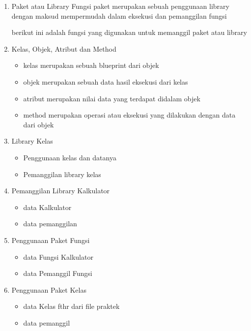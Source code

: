 \begin{enumerate}
\item Paket atau Library Fungsi
	\subitem paket merupakan sebuah penggunaan library dengan maksud mempermudah dalam eksekusi dan pemanggilan fungsi
		
	berikut ini adalah fungsi yang digunakan untuk memanggil paket atau library
		
\item Kelas, Objek, Atribut dan Method
	\begin{itemize}
	\item kelas merupakan sebuah blueprint dari objek
	\item objek merupakan sebuah data hasil eksekusi dari kelas
	\item atribut merupakan nilai data yang terdapat didalam objek
	\item method merupakan operasi atau eksekusi yang dilakukan dengan data dari objek
		
	\end{itemize}
\item Library Kelas
	\begin{itemize}
	\item Penggunaan kelas dan datanya
		
	\item Pemanggilan library kelas
		
	\end{itemize}
\item Pemanggilan Library Kalkulator
	\begin{itemize}
	\item data Kalkulator
		
	\item data pemanggilan
		
	\end{itemize}
\item Penggunaan Paket Fungsi
	\begin{itemize}
	\item data Fungsi Kalkulator
		
	\item data Pemanggil Fungsi
		
	\end{itemize}
\item Penggunaan Paket Kelas
	\begin{itemize}
	\item data Kelas fthr dari file praktek
		
	\item data pemanggil
		
	\end{itemize}
\end{enumerate}

